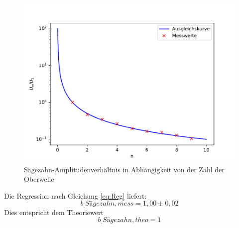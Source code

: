 \begin{figure}
\centering
\includegraphics[width=\linewidth-75pt,height=\textheight-75pt,keepaspectratio]{content/images/saegezahn.pdf}
\caption{Sägezahn-Amplitudenverhältnis in Abhängigkeit von der Zahl der Oberwelle}\label{fig:S}
\end{figure}
Die Regression nach Gleichung \eqref{eq:Reg} liefert:
\[
b_.{Sägezahn,mess} = 1,00 \pm 0,02
\]
Dies entspricht dem Theoriewert 
\[
b_.{Sägezahn,theo} = 1
\]
